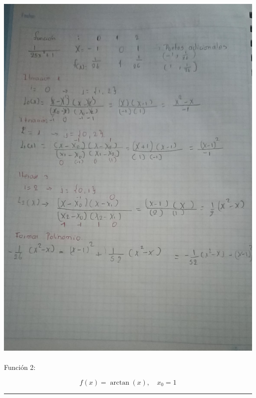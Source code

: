 \documentclass[
  letterpaper,
  DIV=11,
  numbers=noendperiod]{scrartcl}
\makeatletter
\let\oldparagraph\paragraph
\renewcommand{\paragraph}{
    \@ifstar
      \xxxParagraphStar
      \xxxParagraphNoStar
  }
\newcommand{\xxxParagraphStar}[1]{\oldparagraph*{#1}\mbox{}}
\newcommand{\xxxParagraphNoStar}[1]{\oldparagraph{#1}\mbox{}}
\makeatother
\begin{document}
\includegraphics{ejer1.jpeg}

\paragraph{Función 2:}\label{funciuxf3n-2}

\[
f(x) = \arctan(x), \quad x_0 = 1
\]

\begin{center}\rule{0.5\linewidth}{0.5pt}\end{center}
\end{document}
